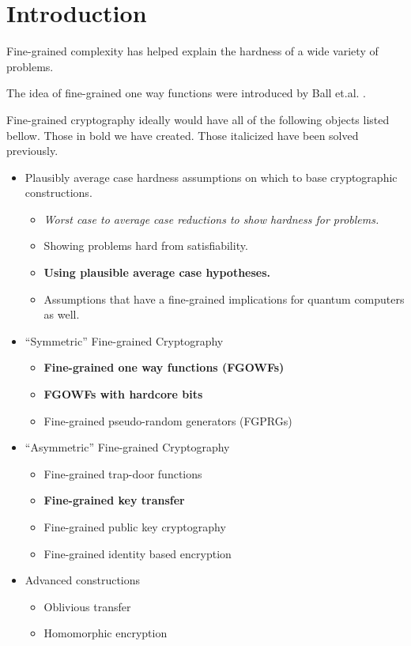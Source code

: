 \section{Introduction}


Fine-grained complexity has helped explain the hardness of a wide variety of problems. 

The idea of fine-grained one way functions were introduced by Ball et.al. \cite{avgCaseFineGrained}. 

Fine-grained cryptography ideally would have all of the following objects listed bellow. Those in bold we have created. Those italicized have been solved previously. 

\begin{itemize}
	\item Plausibly average case hardness assumptions on which to base cryptographic constructions. 
	\begin{itemize}
		\item \textit{Worst case to average case reductions to show hardness for problems.} \cite{avgCaseFineGrained}
		\item Showing problems hard from satisfiability. 
		\item \textbf{Using plausible average case hypotheses. }
		\item Assumptions that have a fine-grained implications for quantum computers as well. 
	\end{itemize}
	\item  ``Symmetric'' Fine-grained Cryptography 
		\begin{itemize}
		\item \textbf{Fine-grained one way functions (FGOWFs)}
		\item \textbf{FGOWFs with hardcore bits}
		\item Fine-grained pseudo-random generators (FGPRGs)
		\end{itemize}
	\item ``Asymmetric'' Fine-grained Cryptography 
		\begin{itemize}
		\item Fine-grained trap-door functions
		\item \textbf{Fine-grained key transfer}
		\item Fine-grained public key cryptography
		\item Fine-grained identity based encryption
		\end{itemize}
	\item Advanced constructions
		\begin{itemize}
		\item Oblivious transfer
		\item Homomorphic encryption
		\end{itemize}
\end{itemize}
